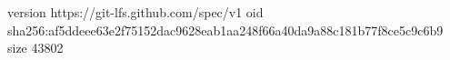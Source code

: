 version https://git-lfs.github.com/spec/v1
oid sha256:af5ddeee63e2f75152dac9628eab1aa248f66a40da9a88c181b77f8ce5c9c6b9
size 43802

